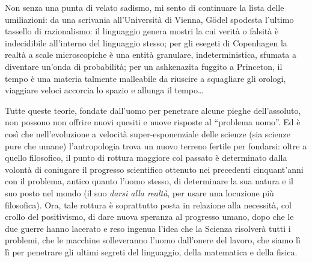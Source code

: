 \documentclass[dvipsnames]{amsart}
\begin{document}
Non senza una punta di velato sadismo, mi sento di continuare la lista delle umiliazioni: da una scrivania all'Università di Vienna, G\"odel spodesta l'ultimo tassello di razionalismo: il linguaggio genera mostri la cui verità o falsità è indecidibile all'interno del linguaggio stesso; per gli esegeti di Copenhagen la realtà a scale microscopiche è una entità granulare, indeterministica, sfumata a diventare un'onda di probabilità; per un ashkenazita fuggito a Princeton, il tempo è una materia talmente malleabile da riuscire a squagliare gli orologi, viaggiare veloci accorcia lo spazio e allunga il tempo\dots 

Tutte queste teorie, fondate dall'uomo per penetrare alcune pieghe dell'assoluto, non possono non offrire nuovi quesiti e nuove risposte al ``problema uomo''. Ed è così che nell'evoluzione a velocità super-esponenziale delle scienze (sia scienze pure che umane) l'antropologia trova un nuovo terreno fertile per fondarsi: oltre a quello filosofico, il punto di rottura maggiore col passato è determinato dalla volontà di coniugare il progresso scientifico ottenuto nei precedenti cinquant'anni con il problema, antico quanto l'uomo stesso, di determinare la sua natura e il suo posto nel mondo (il suo \emph{darsi alla realtà}, per usare una locuzione più filosofica). Ora, tale rottura è soprattutto posta in relazione alla necessità, col crollo del positivismo, di dare nuova speranza al progresso umano, dopo che le due guerre hanno lacerato e reso ingenua l'idea che la Scienza risolverà tutti i problemi, che le macchine solleveranno l'uomo dall'onere del lavoro, che siamo lì lì per penetrare gli ultimi segreti del linguaggio, della matematica e della fisica.
\end{document}
